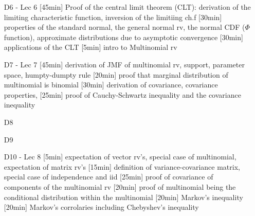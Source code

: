\begin{enumerate}



\item[D6 - Lec 6] [45min] Proof of the central limit theorem (CLT): derivation of the limiting characteristic function, inversion of the limitiing ch.f [30min] properties of the standard normal, the general normal rv, the normal CDF ($\Phi$ function), approximate distributions due to asymptotic convergence [30min] applications of the CLT [5min] intro to Multinomial rv

\item[D7 - Lec 7] [45min] derivation of JMF of multinomial rv, support, parameter space, humpty-dumpty rule [20min] proof that marginal distribution of multinomial is binomial [30min] derivation of covariance, covariance properties, [25min] proof of Cauchy-Schwartz inequality and the covariance inequality



\item[D8] 
\item[D9] 


\item[D10 - Lec 8]  [5min] expectation of vector rv's, special case of multinomial, expectation of matrix rv's [15min] definition of variance-covariance matrix, special case of independence and iid [25min] proof of covariance of components of the multinomial rv [20min] proof of multinomial being the conditional distribution within the multinomial [20min] Markov's inequality [20min] Markov's corrolaries including Chebyshev's inequality


\end{enumerate}
